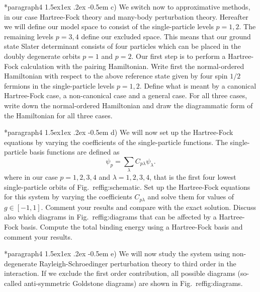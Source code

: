 \documentclass[%
twoside,                 %
final,                   %
10pt]{article}
\makeatletter
\newenvironment{doconceexercise}{}{}
\newcommand\subex{\@startsection*{paragraph}{4}{\z@}%
                  {1.5ex\@plus1ex \@minus.2ex}%
                  {-0.5em}%
                  {\normalfont\normalsize\bfseries}}
\makeatother
\begin{document}
\begin{doconceexercise}
\subex{c)}
We switch now to approximative methods, in our case Hartree-Fock
  theory and many-body perturbation theory. Hereafter we will define
  our model space to consist of the single-particle levels $p=1,2$.
  The remaining levels $p=3,4$ define our excluded space.  This means
  that our ground state Slater determinant consists of four particles
  which can be placed in the doubly degenerate orbits $p=1$ and $p=2$.
  Our first step is to perform a Hartree-Fock calculation with the
  pairing Hamiltonian.  Write first the normal-ordered Hamiltonian
  with respect to the above reference state given by four spin $1/2$
  fermions in the single-particle levels $p=1,2$. Define what is meant
  by a canonical Hartree-Fock case, a non-canonical case and a general
  case.  For all three cases, write down the normal-ordered
  Hamiltonian and draw the diagrammatic form of the Hamiltonian for all three cases.



\subex{d)}
We will now set up the Hartree-Fock equations by varying the
coefficients of the single-particle functions. The single-particle
basis functions are defined as
\[
\psi_p = \sum_{\lambda} C_{p\lambda}\psi_{\lambda}.
\]
where in our case $p=1,2,3,4$ and $\lambda=1,2,3,4$, that is the first
four lowest single-particle orbits of Fig.~ref{fig:schematic}.  Set
up the Hartree-Fock equations for this system by varying the
coefficients $C_{p\lambda}$ and solve them for values of $g\in
[-1,1]$.  Comment your results and compare with the exact
solution. Discuss also which diagrams in Fig.~ref{fig:diagrams} that
can be affected by a Hartree-Fock basis. Compute the total binding
energy using a Hartree-Fock basis and comment your results.



\subex{e)}
We will now study the system using non-degenerate
Rayleigh-Schroedinger perturbation theory to third order in the
interaction.  If we exclude the first order contribution, all possible
diagrams (so-called anti-symmetric Goldstone diagrams) are
shown in Fig.~ref{fig:diagrams}.



\end{doconceexercise}
\end{document}
